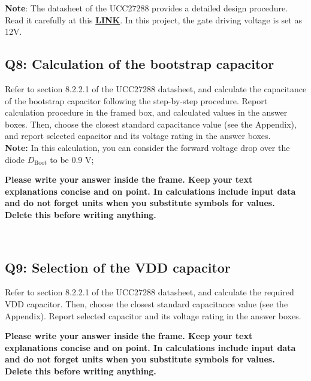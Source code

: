 \documentclass{PELsmallreport}
\begin{document}
\textbf{Note}: The datasheet of the UCC27288 provides a detailed design procedure. Read it carefully at this \href{https://www.ti.com/lit/ds/symlink/ucc27288.pdf}{\textbf{LINK}}. In this project, the gate driving voltage is set as 12V.

\subsection{Q8: Calculation of the bootstrap capacitor}
Refer to section 8.2.2.1 of the UCC27288 datasheet, and calculate the capacitance of the bootstrap capacitor following the step-by-step procedure. Report calculation procedure in the framed box, and calculated values in the answer boxes. Then, choose the closest standard capacitance value (see the Appendix), and report selected capacitor and its voltage rating in the answer boxes.\\
\textbf{Note:} In this calculation, you can consider the forward voltage drop over the diode $D_{\text{Boot}}$ to be 0.9 V; 

\begin{framed}
	\vspace{2em}
	\textbf{Please write your answer inside the frame. Keep your text explanations concise and on point. In calculations include input data and do not forget units when you substitute symbols for values. \\ Delete this before writing anything.}
	\vspace{2em}
\end{framed}
 \quad {} \quad {} \\
 \quad {} \hfill {}

\subsection{Q9: Selection of the VDD capacitor}
Refer to section 8.2.2.1 of the UCC27288 datasheet, and calculate the required VDD capacitor. Then, choose the closest standard capacitance value (see the Appendix). Report selected capacitor and its voltage rating in the answer boxes.
\begin{framed}
	\vspace{2em}
	\textbf{Please write your answer inside the frame. Keep your text explanations concise and on point. In calculations include input data and do not forget units when you substitute symbols for values. \\ Delete this before writing anything.}
	\vspace{2em}
\end{framed}
 \quad {} \hfill {}
\end{document}
